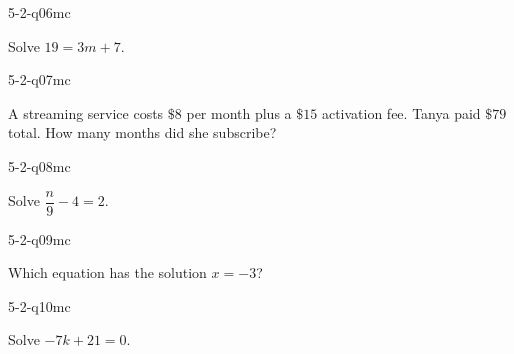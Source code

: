 \begin{practiceQuestion}{5-2-q06}{mc}
\begin{questionText}
Solve $19 = 3m + 7$.
\end{questionText}
\end{practiceQuestion}

\begin{practiceQuestion}{5-2-q07}{mc}
\begin{questionText}
A streaming service costs $\$8$ per month plus a $\$15$ activation fee. Tanya paid $\$79$ total. How many months did she subscribe?
\end{questionText}
\end{practiceQuestion}

\begin{practiceQuestion}{5-2-q08}{mc}
\begin{questionText}
Solve $\dfrac{n}{9} - 4 = 2$.
\end{questionText}
\end{practiceQuestion}

\begin{practiceQuestion}{5-2-q09}{mc}
\begin{questionText}
Which equation has the solution $x = -3$?
\end{questionText}
\end{practiceQuestion}

\begin{practiceQuestion}{5-2-q10}{mc}
\begin{questionText}
Solve $-7k + 21 = 0$.
\end{questionText}
\end{practiceQuestion}

